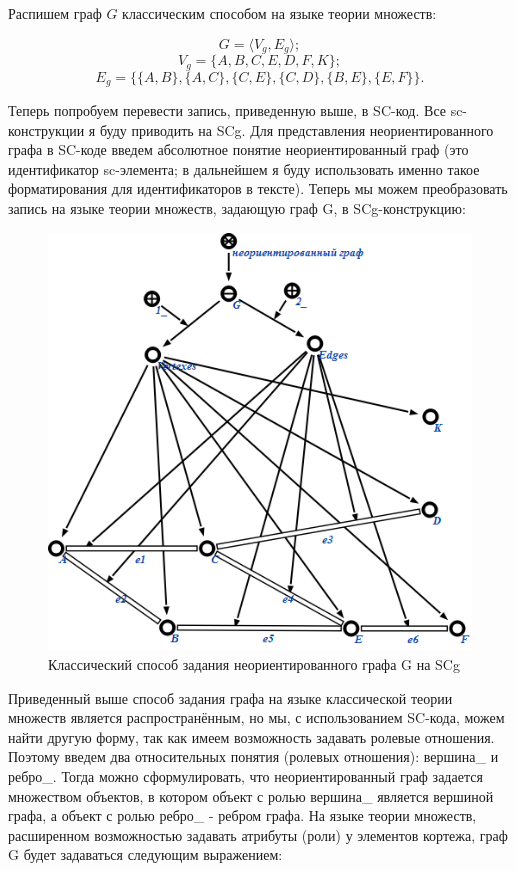 Распишем граф $G$ классическим способом на языке теории множеств:

\[ G = \langle V_g, E_g \rangle; \]
\[ V_g = \{A, B, C, E, D, F, K\}; \]
\[ E_g = \{\{A, B\}, \{A, C\}, \{C, E\}, \{C, D\}, \{B, E\}, \{E, F\}\}. \]

Теперь попробуем перевести запись, приведенную выше, в SC-код. Все
sc-конструкции я буду приводить на SCg. Для представления
неориентированного графа в SC-коде введем абсолютное понятие
неориентированный граф (это идентификатор sc-элемента; в дальнейшем я
буду использовать именно такое форматирования для идентификаторов в
тексте). Теперь мы можем преобразовать запись на языке теории
множеств, задающую граф G, в SCg-конструкцию:

\begin{figure}[h]
  \centering
  \includegraphics[scale=0.6]{images/2/Undirected_graph_Classical_method}
  \caption{Классический способ задания неориентированного графа G на SCg}
  \label{fig:Undirected_graph_Classical_method}
\end{figure}

Приведенный выше способ задания графа на языке классической теории
множеств является распространённым, но мы, с использованием SC-кода,
можем найти другую форму, так как имеем возможность задавать ролевые
отношения. Поэтому введем два относительных понятия (ролевых
отношения): вершина\_ и ребро\_. Тогда можно сформулировать, что
неориентированный граф задается множеством объектов, в котором объект
с ролью вершина\_ является вершиной графа, а объект с ролью ребро\_ -
ребром графа. На языке теории множеств, расширенном возможностью
задавать атрибуты (роли) у элементов кортежа, граф G будет задаваться
следующим выражением: 

